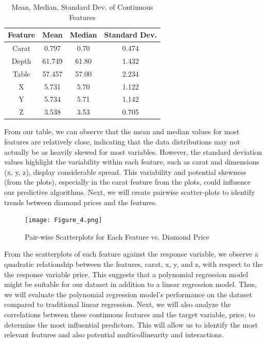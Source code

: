 \documentclass[conference]{IEEEtran}
\begin{document}
\begin{table}[H]
    \centering
    \caption{Mean, Median, Standard Dev. of Continuous Features}
    \label{tab:example_table}
    \begin{tabular}{|c|c|c|c|}
        \hline
        Feature & Mean & Median & Standard Dev. \\
        \hline
        Carat & 0.797 & 0.70 & 0.474 \\
        \hline
        Depth & 61.749 & 61.80  & 1.432 \\
        \hline
        Table & 57.457 & 57.00 & 2.234 \\
        \hline
        X & 5.731 & 5.70 & 1.122 \\
        \hline
        Y & 5.734 & 5.71 & 1.142 \\
        \hline
        Z & 3.538 & 3.53 & 0.705 \\
        \hline
    \end{tabular}
\end{table}

From our table, we can observe that the mean and median values for most features are relatively close, indicating that the data distributions may not actually be as heavily skewed for most variables. However, the standard deviation values highlight the variability within each feature, such as carat and dimensions (x, y, z), display considerable spread. This variability and potential skewness (from the plots), especially in the carat feature from the plots, could influence our predictive algorithms. Next, we will create pairwise scatter-plots to identify trends between diamond prices and the features.

\begin{figure}[H]
    \centering
    \texttt{[image: Figure\_4.png]} %
    \caption{Pair-wise Scatterplots for Each Feature vs. Diamond Price}
    \label{fig:image_label}
\end{figure}

From the scatterplots of each feature against the response variable, we observe a quadratic relationship between the features, carat, x, y, and z, with respect to the the response variable price. This suggests that a polynomial regression model might be suitable for our dataset in addition to a linear regression model. Thus, we will evaluate the polynomial regression model's performance on the dataset compared to traditional linear regression. Next, we will also analyze the correlations between these continuous features and the target variable, price, to determine the most influential predictors. This will allow us to identify the most relevant features and also potential multicollinearity and interactions.
\end{document}
